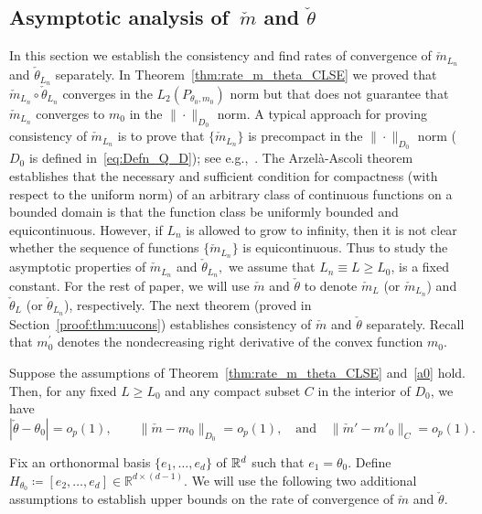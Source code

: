 \subsection[Asymptotic analysis of the separated parameters]{Asymptotic analysis of~$\check{m}$ and $\check{\theta}$}\label{sec:SepPara}
In this section we establish the consistency and find rates of convergence of $\check{m}_{L_n}$ and $\check{\theta}_{L_n}$ separately. In Theorem~\ref{thm:rate_m_theta_CLSE} we proved that $\check{m}_{L_n}\circ\check{\theta}_{L_n}$ converges in the $L_2(P_{\theta_0, m_0})$ norm but that does not guarantee that $\check{m}_{L_n}$ converges to $m_0$ in the $\|\cdot\|_{D_0}$ norm. A typical approach for proving consistency of $\check{m}_{L_n}$ is to prove that $\{\check{m}_{L_n}\}$ is precompact in the $\|\cdot\|_{D_0}$ norm ($D_0$ is defined in~\eqref{eq:Defn_Q_D}); see e.g.,~\cite{2016arXiv161006026B,VANC}. The Arzel\`{a}-Ascoli theorem establishes that the necessary and sufficient condition for compactness (with respect to the uniform norm) of an arbitrary class of continuous functions on a bounded domain is that the function class be uniformly bounded and equicontinuous. However, if $L_n$ is allowed to grow to infinity, then it is not clear whether the sequence of functions $\{\check{m}_{L_n}\}$ is equicontinuous.  Thus to study the asymptotic properties of $\check{m}_{L_n}$ and $\check{\theta}_{L_n},$ we assume that $L_n\equiv L \ge L_0$, is a fixed constant.  For the rest of paper, we will use $\check{m}$ and $\check\theta$ to denote $\check{m}_L$ (or $\check{m}_{{L_n}}$) and $\check\theta_L$ (or $\check{\theta}_{{L_n}}$), respectively. The next theorem (proved in Section~\ref{proof:thm:uucons}) establishes consistency of $\check{m}$ and $\check{\theta}$ separately. Recall that $m_0^\prime$ denotes the nondecreasing right derivative of the  convex function $m_0$. 
 \begin{thm}\label{thm:uucons} Suppose the assumptions of Theorem~\ref{thm:rate_m_theta_CLSE} and~\ref{a0} hold. Then, for any fixed $L\ge L_0$ and any compact subset $C$ in the interior of $D_0$, we have
\[
|\check{\theta} - \theta_0| = o_p(1), \qquad  \|\check{m} - m_0\|_{D_0} = o_p(1), \quad \text{and} \quad \|\check{m}' - m'_0\|_{C} = o_p(1). \]
\end{thm}

Fix an orthonormal basis  $\{e_1,\ldots, e_d\}$ of $\mathbb{R}^d$ such that $e_1 =\theta_0.$ Define $H_{\theta_0}\coloneqq [e_2,\ldots,e_d]\in\mathbb{R}^{d\times(d-1)}$. We will use the following two additional assumptions to establish upper bounds on the rate of convergence of $\check{m}$ and $\check{\theta}.$ 


